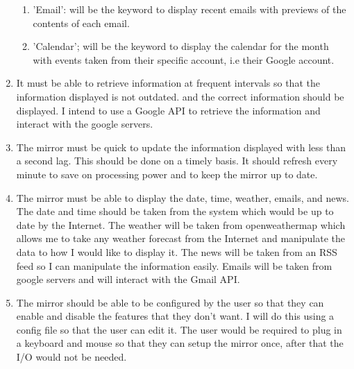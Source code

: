 \documentclass[12pt]{article}
\begin{document}
\begin{enumerate}
\begin{enumerate}
                    \item 'Email': will be the keyword to display recent emails with previews of the contents of each email.

                    \item 'Calendar'; will be the keyword to display the calendar for the month with events taken from their specific account, i.e their Google account.
                \end{enumerate}

            \item It must be able to retrieve information at frequent intervals so that the information displayed is not outdated. and the correct information should be displayed. I intend to use a Google API to retrieve the information and interact with the google servers.

            \item The mirror must be quick to update the information displayed with less than a second lag. This should be done on a timely basis. It should refresh every minute to save on processing power and to keep the mirror up to date.

            \item The mirror must be able to display the date, time, weather, emails, and news. The date and time should be taken from the system which would be up to date by the Internet. The weather will be taken from openweathermap which allows me to take any weather forecast from the Internet and manipulate the data to how I would like to display it. The news will be taken from an RSS feed so I can manipulate the information easily. Emails will be taken from google servers and will interact with the Gmail API.

            \item The mirror should be able to be configured by the user so that they can enable and disable the features that they don't want. I will do this using a config file so that the user can edit it. The user would be required to plug in a keyboard and mouse so that they can setup the mirror once, after that the I/O would not be needed.

        \end{enumerate}
\end{document}
